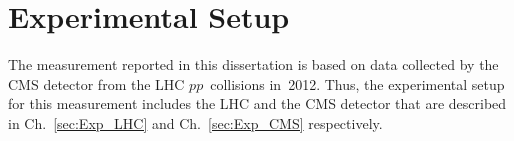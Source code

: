 \chapter{Experimental Setup} %
\label{sec:Exp}

The measurement reported in this dissertation is based on data collected by the CMS detector from the LHC $pp$~collisions in~2012. Thus, the experimental setup for this measurement includes the LHC and the CMS detector that are described in Ch.~\ref{sec:Exp_LHC} and Ch.~\ref{sec:Exp_CMS} respectively. 

